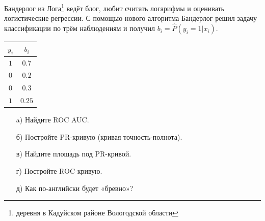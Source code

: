 \documentclass[12pt, a4paper, oneside]{article}
\begin{document}
	Бандерлог из Лога\footnote{деревня в Кадуйском районе Вологодской области} ведёт блог, любит считать логарифмы и оценивать логистические регрессии. С помощью нового алгоритма Бандерлог решил задачу классификации по трём наблюдениям и получил $b_i = \hat P(y_i = 1|x_i)$.
	
\begin{center}
	\begin{tabular}{c|c}
		$y_i$ & $b_i$ \\
		\hline
		$1$  & $0.7$ \\
		$0$ & $0.2$ \\
		$0$ & $0.3$ \\
		$1$ & $0.25$ \\
	\end{tabular}
\end{center}
	
	\begin{enumerate}
		\item[a)] Найдите ROC AUC.
		\item[б)] Постройте PR-кривую (кривая точность-полнота).
		\item[в)] Найдите площадь под PR-кривой.
		\item[г)] Постройте ROC-кривую.
		\item[д)] Как по-английски будет «бревно»?
	\end{enumerate}
\end{document}
